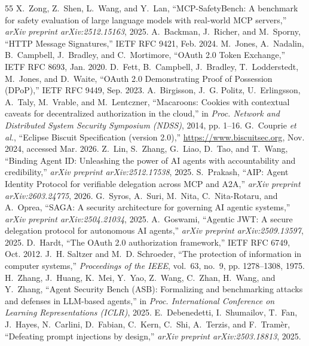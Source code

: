 \documentclass[conference,10pt]{IEEEtran}
\begin{document}
\begin{thebibliography}{55}
 X.~Zong, Z.~Shen, L.~Wang, and Y.~Lan, ``MCP-SafetyBench: A benchmark for safety evaluation of large language models with real-world MCP servers,'' \textit{arXiv preprint arXiv:2512.15163}, 2025.
 A.~Backman, J.~Richer, and M.~Sporny, ``HTTP Message Signatures,'' IETF RFC 9421, Feb. 2024.
 M.~Jones, A.~Nadalin, B.~Campbell, J.~Bradley, and C.~Mortimore, ``OAuth 2.0 Token Exchange,'' IETF RFC 8693, Jan. 2020.
 D.~Fett, B.~Campbell, J.~Bradley, T.~Lodderstedt, M.~Jones, and D.~Waite, ``OAuth 2.0 Demonstrating Proof of Possession (DPoP),'' IETF RFC 9449, Sep. 2023.
 A.~Birgisson, J.~G. Politz, U.~Erlingsson, A.~Taly, M.~Vrable, and M.~Lentczner, ``Macaroons: Cookies with contextual caveats for decentralized authorization in the cloud,'' in \textit{Proc. Network and Distributed System Security Symposium (NDSS)}, 2014, pp. 1--16.
 G.~Couprie \textit{et al.}, ``Eclipse Biscuit Specification (version 2.0),'' \url{https://www.biscuitsec.org}, Nov. 2024, accessed Mar. 2026.
 Z.~Lin, S.~Zhang, G.~Liao, D.~Tao, and T.~Wang, ``Binding Agent ID: Unleashing the power of AI agents with accountability and credibility,'' \textit{arXiv preprint arXiv:2512.17538}, 2025.
 S.~Prakash, ``AIP: Agent Identity Protocol for verifiable delegation across MCP and A2A,'' \textit{arXiv preprint arXiv:2603.24775}, 2026.
 G.~Syros, A.~Suri, M.~Nita, C.~Nita-Rotaru, and A.~Oprea, ``SAGA: A security architecture for governing AI agentic systems,'' \textit{arXiv preprint arXiv:2504.21034}, 2025.
 A.~Goswami, ``Agentic JWT: A secure delegation protocol for autonomous AI agents,'' \textit{arXiv preprint arXiv:2509.13597}, 2025.
 D.~Hardt, ``The OAuth 2.0 authorization framework,'' IETF RFC 6749, Oct. 2012.
 J.~H. Saltzer and M.~D. Schroeder, ``The protection of information in computer systems,'' \textit{Proceedings of the IEEE}, vol.~63, no.~9, pp. 1278--1308, 1975.
 H.~Zhang, J.~Huang, K.~Mei, Y.~Yao, Z.~Wang, C.~Zhan, H.~Wang, and Y.~Zhang, ``Agent Security Bench (ASB): Formalizing and benchmarking attacks and defenses in LLM-based agents,'' in \textit{Proc. International Conference on Learning Representations (ICLR)}, 2025.
 E.~Debenedetti, I.~Shumailov, T.~Fan, J.~Hayes, N.~Carlini, D.~Fabian, C.~Kern, C.~Shi, A.~Terzis, and F.~Tram{\`e}r, ``Defeating prompt injections by design,'' \textit{arXiv preprint arXiv:2503.18813}, 2025.

\end{thebibliography}
\end{document}
